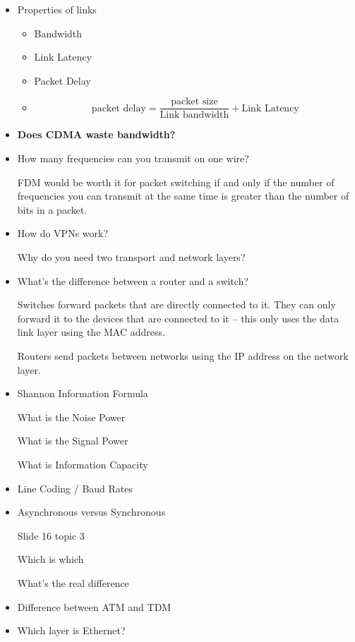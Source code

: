 \documentclass[10pt, a4paper]{article}
\begin{document}
\begin{itemize}

\item Properties of links

\begin{itemize}

\item Bandwidth

\item Link Latency

\item Packet Delay

\item \[
\text{packet delay} = \frac{\text{packet size}}{\text{Link bandwidth}} +
\text{Link Latency}
\]

\end{itemize}

\item \textbf{Does CDMA waste bandwidth?}

\item How many frequencies can you transmit on one wire?

FDM would be worth it for packet switching if and only if the number of
frequencies you can transmit at the same time is greater than the number of
bits in a packet.

\item How do VPNs work?

Why do you need two transport and network layers?

\item What's the difference between a router and a switch?

Switches forward packets that are directly connected to it. They can only
forward it to the devices that are connected to it -- this only uses the
data link layer using the MAC address.

Routers send packets between networks using the IP address on the network
layer.

\item Shannon Information Formula

What is the Noise Power

What is the Signal Power

What is Information Capacity

\item Line Coding / Baud Rates

\item Asynchronous versus Synchronous

Slide 16 topic 3

Which is which

What's the real difference

\item Difference between ATM and TDM

\item Which layer is Ethernet?

\end{itemize}
\end{document}

